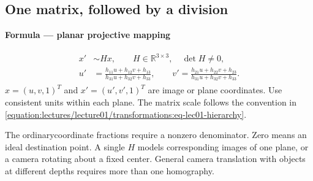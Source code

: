 \documentclass[letterpaper,11pt,english,openany,oneside]{jupyterBook}
\begin{document}
\subsection{One matrix, followed by a division}
\label{\detokenize{lectures/lecture02/homographies:one-matrix-followed-by-a-division}}
\begin{TextbookBox}
\textbf{Formula — planar projective mapping}\par\smallskip
\begin{equation}\label{equation:lectures/lecture02/homographies:eq-lec02-homography}
\begin{split}\begin{aligned}
x'&\sim Hx,\qquad H\in\mathbb R^{3\times3},\quad\det H\ne0,\\
u'&=\frac{h_{11}u+h_{12}v+h_{13}}{h_{31}u+h_{32}v+h_{33}},\qquad
v'=\frac{h_{21}u+h_{22}v+h_{23}}{h_{31}u+h_{32}v+h_{33}}.
\end{aligned}\end{split}
\end{equation}
\sphinxAtStartPar
\(x=(u,v,1)^T\) and \(x'=(u',v',1)^T\) are image or plane coordinates. Use consistent units within each plane. The matrix scale follows the convention in \eqref{equation:lectures/lecture01/transformations:eq-lec01-hierarchy}.

\sphinxAtStartPar
The ordinary\sphinxhyphen{}coordinate fractions require a nonzero denominator. Zero means an ideal destination point. A single \(H\) models corresponding images of one plane, or a camera rotating about a fixed center. General camera translation with objects at different depths requires more than one homography.

\end{TextbookBox}
\end{document}
